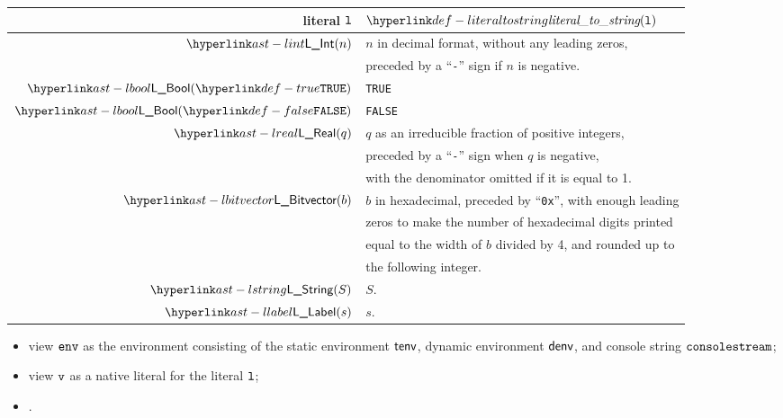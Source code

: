 \begin{tabular}{rl}
\textbf{literal $\vl$} & \textbf{$\literaltostring(\vl)$} \\
\hline
$\lint(n)$        & $n$ in decimal format, without any leading zeros, \\
                  & preceded by a ``\texttt{-}'' sign if $n$ is negative. \\
$\lbool(\True)$   & \texttt{TRUE} \\
$\lbool(\False)$  & \texttt{FALSE} \\
$\lreal(q)$       & $q$ as an irreducible fraction of positive integers, \\
                  & preceded by a ``\texttt{-}'' sign when $q$ is negative, \\
                  & with the denominator omitted if it is equal to 1. \\
$\lbitvector(b)$  & $b$ in hexadecimal, preceded by ``\texttt{0x}'', with enough leading \\
                  & zeros to make the number of hexadecimal digits printed \\
                  & equal to the width of $b$ divided by 4, and rounded up to \\
                  & the following integer.\\
$\lstring(S)$     & $S$. \\
$\llabel(s)$      & $s$. \\
\end{tabular}

\ProseParagraph
\AllApply
\begin{itemize}
  \item view $\env$ as the environment consisting of the static environment $\tenv$,
        dynamic environment $\denv$, and console string $\vconsolestream$;
  \item view $\vv$ as a native literal for the literal $\vl$;
  \item {}.
\end{itemize}

\FormallyParagraph
\begin{mathpar}
\end{mathpar}

